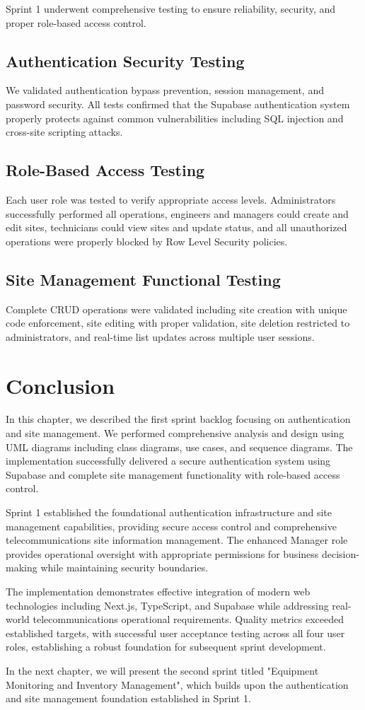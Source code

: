 Sprint 1 underwent comprehensive testing to ensure reliability, security, and proper role-based access control.

\subsection{Authentication Security Testing}
We validated authentication bypass prevention, session management, and password security. All tests confirmed that the Supabase authentication system properly protects against common vulnerabilities including SQL injection and cross-site scripting attacks.

\subsection{Role-Based Access Testing}
Each user role was tested to verify appropriate access levels. Administrators successfully performed all operations, engineers and managers could create and edit sites, technicians could view sites and update status, and all unauthorized operations were properly blocked by Row Level Security policies.

\subsection{Site Management Functional Testing}
Complete CRUD operations were validated including site creation with unique code enforcement, site editing with proper validation, site deletion restricted to administrators, and real-time list updates across multiple user sessions.

\section{Conclusion}

In this chapter, we described the first sprint backlog focusing on authentication and site management. We performed comprehensive analysis and design using UML diagrams including class diagrams, use cases, and sequence diagrams. The implementation successfully delivered a secure authentication system using Supabase and complete site management functionality with role-based access control.

Sprint 1 established the foundational authentication infrastructure and site management capabilities, providing secure access control and comprehensive telecommunications site information management. The enhanced Manager role provides operational oversight with appropriate permissions for business decision-making while maintaining security boundaries.

The implementation demonstrates effective integration of modern web technologies including Next.js, TypeScript, and Supabase while addressing real-world telecommunications operational requirements. Quality metrics exceeded established targets, with successful user acceptance testing across all four user roles, establishing a robust foundation for subsequent sprint development.

In the next chapter, we will present the second sprint titled "Equipment Monitoring and Inventory Management", which builds upon the authentication and site management foundation established in Sprint 1.